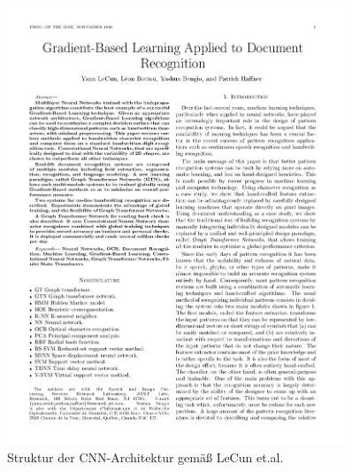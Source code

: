 \begin{figure}
  \includegraphics[page=7,width=0.9\textwidth,viewport=20 600 560 740,clip]{../../MLbib/CNN/Lecun98.pdf}

  \caption{Struktur der CNN-Architektur gemäß LeCun et.al. \cite{LeCun:1998}}\label{Concept:LeNet}
\end{figure}

